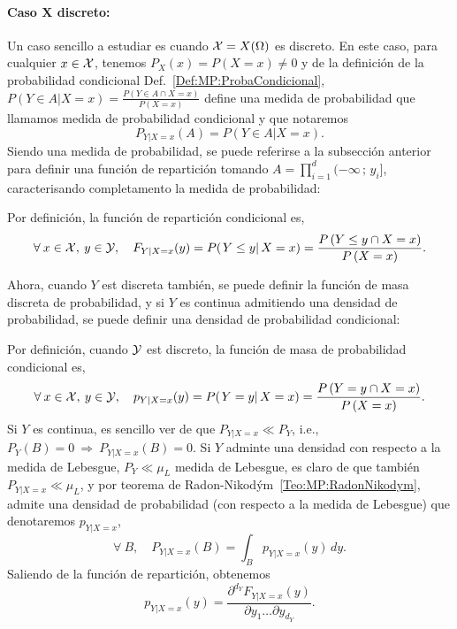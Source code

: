 
\paragraph{Caso $\boldsymbol{X}$ discreto:}
Un caso  sencillo a estudiar  es cuando $\mathcal{X}  = X(\Omega)$ es discreto.   En este
caso, para  cualquier $x  \in \mathcal{X}$, tenemos  $P_X(x) = P(X  = x)  \ne 0$ y  de la
definici\'on de  la probabilidad condicional Def.~\ref{Def:MP:ProbaCondicional},
$P(Y \in A | X = x) = \frac{P(Y \in A \cap X = x)}{P(X=x)}$ define una medida de
probabilidad que llamamos medida de probabilidad condicional y que notaremos
%
\[
P_{Y|X=x}(A) = P(Y \in A | X = x).
\]
%
Siendo una medida de probabilidad, se puede referirse a la subsecci\'on anterior
para  definir  una  funci\'on   de  repartici\'on  tomando  $\displaystyle  A  =
\prod_{i=1}^d (-\infty \, ; \,  y_i]$, caracterisando completamento la medida de
probabilidad:
%
\begin{definicion}
\label{Def:MP:ReparticionCondicionalDiscreta}
%
  Por definici\'on, la funci\'on de repartici\'on condicional es,
  \[
  \forall \:  x \in  \mathcal{X}, \: y  \in \mathcal{Y}, \quad  F_{Y|X=x}(y) =  P( \left. Y  \le y
  \right|  X =  x  ) =  \frac{P\left(Y  \le y  \cap X  =  x \right)}{P\left(X  =
      x\right)}.
  \]
\end{definicion}

Ahora, cuando $Y$ est discreta tambi\'en,  se puede definir la funci\'on de masa
discreta  de probabilidad,  y  si $Y$  es  continua admitiendo  una densidad  de
probabilidad, se puede definir una densidad de probabilidad condicional:
%
\begin{definicion}
\label{Def:MP:ReparticionCondicionalDiscreta}
%
  Por  definici\'on,  cuando  $\mathcal{Y}$  est   discreto,  la  funci\'on  de  masa  de
  probabilidad condicional es,
  \[
  \forall \:  x \in  \mathcal{X}, \: y  \in \mathcal{Y}, \quad  p_{Y|X=x}(y) =  P( \left. Y  = y
  \right|  X =  x  ) =  \frac{P\left(Y  = y  \cap X  =  x \right)}{P\left(X  =
      x\right)}.
  \]
  Si $Y$ es continua, es sencillo  ver de que $P_{Y|X=x} \ll P_Y$, i.e., $P_Y(B)
  = 0  \: \Rightarrow  \: P_{Y|X=x}(B) =  0$.  Si  $Y$ adminte una  densidad con
  respecto a la medida de Lebesgue, $P_Y \ll \mu_L$ medida de Lebesgue, es claro
  de    que   tambi\'en   $P_{Y|X=x}    \ll   \mu_L$,    y   por    teorema   de
  Radon-Nikod\'ym~\ref{Teo:MP:RadonNikodym}, admite una densidad de probabilidad
  (con respecto a la medida de Lebesgue) que denotaremos $p_{Y|X=x}$,
  \[
  \forall \: B, \quad P_{Y|X=x}(B) = \int_B p_{Y|X=x}(y) \, dy.
  \]
  Saliendo de la funci\'on de repartici\'on, obtenemos
  \[
  p_{Y|X=x}(y) = \frac{\partial^{d_Y} F_{Y|X=x}(y)}{\partial y_1 \ldots \partial
    y_{d_Y}}.
  \]
\end{definicion}


